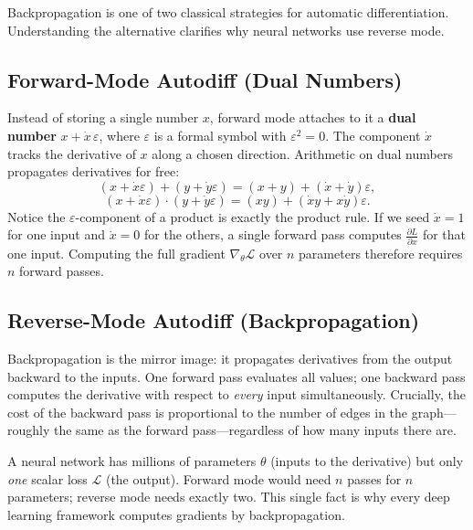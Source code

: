 \documentclass{tufte-handout}
\let\subsubsection\subsection
\begin{document}
Backpropagation is one of two classical strategies for automatic differentiation. Understanding the alternative clarifies why neural networks use reverse mode.

\subsubsection{Forward-Mode Autodiff (Dual Numbers)}

Instead of storing a single number $x$, forward mode attaches to it a \textbf{dual number} $x + \dot{x}\,\varepsilon$, where $\varepsilon$ is a formal symbol with $\varepsilon^2 = 0$. The component $\dot{x}$ tracks the derivative of $x$ along a chosen direction. Arithmetic on dual numbers propagates derivatives for free:
\[
(x + \dot{x}\varepsilon) + (y + \dot{y}\varepsilon) = (x+y) + (\dot{x}+\dot{y})\varepsilon,
\]
\[
(x + \dot{x}\varepsilon) \cdot (y + \dot{y}\varepsilon) = (xy) + (\dot{x}y + x\dot{y})\varepsilon.
\]
Notice the $\varepsilon$-component of a product is exactly the product rule. If we seed $\dot{x} = 1$ for one input and $\dot{x} = 0$ for the others, a single forward pass computes $\frac{\partial L}{\partial x}$ for that one input. Computing the full gradient $\nabla_\theta \mathcal{L}$ over $n$ parameters therefore requires $n$ forward passes.

\subsubsection{Reverse-Mode Autodiff (Backpropagation)}

Backpropagation is the mirror image: it propagates derivatives from the output backward to the inputs. One forward pass evaluates all values; one backward pass computes the derivative with respect to \emph{every} input simultaneously. Crucially, the cost of the backward pass is proportional to the number of edges in the graph---roughly the same as the forward pass---regardless of how many inputs there are.

\begin{remark}
A neural network has millions of parameters $\theta$ (inputs to the derivative) but only \emph{one} scalar loss $\mathcal{L}$ (the output). Forward mode would need $n$ passes for $n$ parameters; reverse mode needs exactly two. This single fact is why every deep learning framework computes gradients by backpropagation.
\end{remark}
\end{document}
